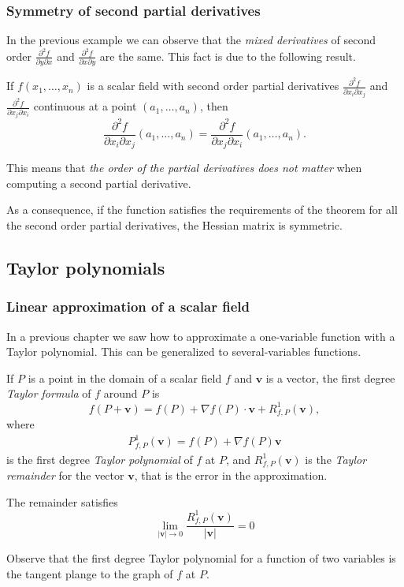 \begin{frame}
\frametitle{Symmetry of second partial derivatives}
In the previous example we can observe that the \emph{mixed derivatives} of second order $\frac{\partial^2 f}{\partial y\partial x}$ and $\frac{\partial^2 f}{\partial x\partial y}$ are the same. 
This fact is due to the following result.

\begin{theorem}
If $f(x_1,\ldots,x_n)$ is a scalar field with second order partial derivatives $\frac{\partial^2 f}{\partial x_i\partial x_j}$ and $\frac{\partial^2 f}{\partial x_j\partial x_i}$ continuous at a point $(a_1,\ldots,a_n)$, then
\[
\frac{\partial^2 f}{\partial x_i\partial x_j}(a_1,\ldots,a_n)=\frac{\partial^2 f}{\partial x_j\partial x_i}(a_1,\ldots,a_n).
\]
\end{theorem}

This means that \alert{\emph{the order of the partial derivatives does not matter}} when computing a second partial derivative.

As a consequence, if the function satisfies the requirements of the theorem for all the second order partial derivatives, the Hessian matrix is symmetric. 
\end{frame}


\subsection{Taylor polynomials}
\begin{frame}
\frametitle{Linear approximation of a scalar field}
In a previous chapter we saw how to approximate a one-variable function with a Taylor polynomial.  
This can be generalized to several-variables functions. 

If $P$ is a point in the domain of a scalar field $f$ and $\mathbf{v}$ is a vector, the first degree \emph{Taylor formula} of $f$ around $P$ is
\[
f(P+\mathbf{v}) = f(P) + \nabla f(P)\cdot \mathbf{v} +R^1_{f,P}(\mathbf{v}),
\]
where
\begin{align*}
P^1_{f,P}(\mathbf{v}) = f(P)+\nabla f(P)\mathbf{v}
\end{align*}
is the first degree \emph{Taylor polynomial} of $f$ at $P$, and $R^1_{f,P}(\mathbf{v})$ is the \emph{Taylor remainder} for the vector $\mathbf{v}$, that is the error in the approximation.

The remainder satisfies
\[
\lim_{|\mathbf{v}|\rightarrow 0} \frac{R^1_{f,P}(\mathbf{v})}{|\mathbf{v}|} = 0
\]

Observe that the first degree Taylor polynomial for a function of two variables is the tangent plange to the graph of $f$ at $P$.
\end{frame}


